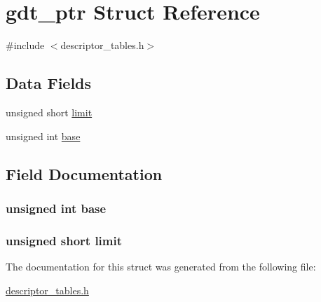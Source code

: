 \hypertarget{structgdt__ptr}{
\section{gdt\_\-ptr Struct Reference}
\label{structgdt__ptr}
}


{\ttfamily \#include $<$descriptor\_\-tables.h$>$}

\subsection*{Data Fields}
\begin{DoxyCompactItemize}
\item 
unsigned short \hyperlink{structgdt__ptr_ab50c2dcb9d4a34ea1a5ac52272502379}{limit}
\item 
unsigned int \hyperlink{structgdt__ptr_a2e013c2c6e8010c8116c6f56813df57b}{base}
\end{DoxyCompactItemize}


\subsection{Field Documentation}
\hypertarget{structgdt__ptr_a2e013c2c6e8010c8116c6f56813df57b}{
\subsubsection[{base}]{\setlength{\rightskip}{0pt plus 5cm}unsigned int {\bf base}}}
\label{structgdt__ptr_a2e013c2c6e8010c8116c6f56813df57b}
\hypertarget{structgdt__ptr_ab50c2dcb9d4a34ea1a5ac52272502379}{
\subsubsection[{limit}]{\setlength{\rightskip}{0pt plus 5cm}unsigned short {\bf limit}}}
\label{structgdt__ptr_ab50c2dcb9d4a34ea1a5ac52272502379}


The documentation for this struct was generated from the following file:\begin{DoxyCompactItemize}
\item 
\hyperlink{descriptor__tables_8h}{descriptor\_\-tables.h}\end{DoxyCompactItemize}
